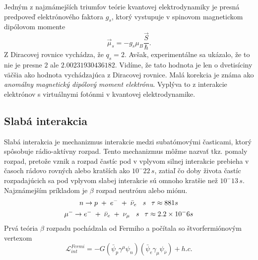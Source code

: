 \documentclass[../../main.tex]{subfiles}
\begin{document}
Jedným z najznámejších triumfov teórie kvantovej elektrodynamiky je presná predpoveď elektrónového faktora $g_s$, ktorý vystupuje v spinovom magnetickom dipólovom momente 
\begin{equation}
\vec{\mu}_s=-g_s\mu_B\frac{\vec{S}}{\hbar}.
\end{equation}
Z Diracovej rovnice vychádza, že $q_s=2$. Avšak, experimentálne sa ukázalo, že to nie je presne $2$ ale $2.00231930436182$. Vidíme, že tato hodnota je len o dvetisíciny väčšia ako hodnota vychádzajúca z Diracovej rovnice. Malá korekcia je známa ako \textit{anomálny magnetický dipólový moment elektrónu}. Vyplýva to z interakcie elektrónov s virtuálnymi fotónmi v kvantovej elektrodynamike.

\subsection{Slabá interakcia}
Slabá interakcia je mechanizmus interakcie medzi subatómovými časticami, ktorý spôsobuje rádio-aktívny rozpad. Tento mechanizmus môžme nazvať tkz. pomaly rozpad, pretože vznik a rozpad častíc pod v vplyvom silnej interakcie prebieha v časoch rádovo rovných alebo kratších ako $10^-{22}\,s$, zatiaľ čo doby života častíc rozpadajúcich sa pod vplyvom slabej interakcie sú omnoho kratšie než $10^-{13}\,s$. Najznámejším príkladom je $\beta$ rozpad neutrónu alebo miónu.
\begin{equation}
\begin{gathered}
n \rightarrow p\hspace{0.1cm}+\hspace{0.1cm}e^-\hspace{0.1cm}+\hspace{0.1cm} \bar{\nu}_e \hspace{0.3cm} \textit{s} \hspace{0.3cm} \tau \approx 881s \\ 
\mu^- \rightarrow e^- \hspace{0.1cm}+\hspace{0.1cm}\bar{\nu}_e\hspace{0.1cm}+\hspace{0.1cm} \nu_{\mu} \hspace{0.3cm} \textit{s} \hspace{0.3cm} \tau \approx 2.2\times10^-6s 
\end{gathered}
\end{equation}
Prvá teória $\beta$ rozpadu pochádzala od Fermiho a počítala so štvorfermiónovým vertexom
\begin{equation}
\mathcal{L}_{int}^{Fermi}=-G(\bar{\psi}_p\gamma^{\mu}\psi_n)(\bar{\psi}_e\gamma_{\mu}\psi_{\bar{\nu}})+h.c.
\end{equation}
\end{document}
